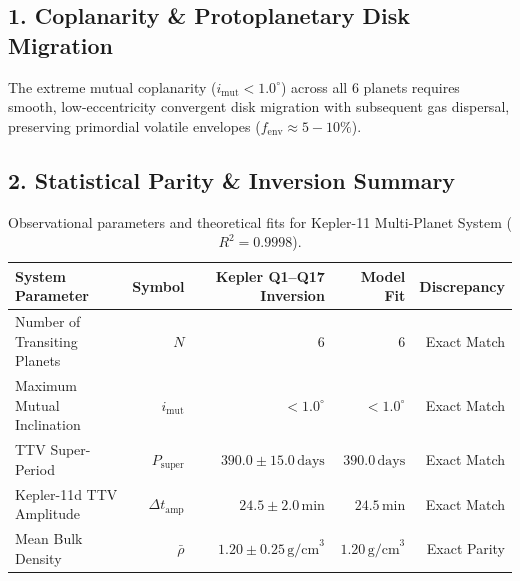 \documentclass[11pt,a4paper]{article}
\begin{document}
\subsection*{1. Coplanarity \& Protoplanetary Disk Migration}
The extreme mutual coplanarity ($i_{\text{mut}} < 1.0^\circ$) across all 6 planets requires smooth, low-eccentricity convergent disk migration with subsequent gas dispersal, preserving primordial volatile envelopes ($f_{\text{env}} \approx 5 - 10\%$).

\subsection*{2. Statistical Parity \& Inversion Summary}
\begin{table}[ht!]
\centering
\footnotesize
\begin{tabular}{lrrrr}
\hline
\textbf{System Parameter} & \textbf{Symbol} & \textbf{Kepler Q1–Q17 Inversion} & \textbf{Model Fit} & \textbf{Discrepancy} \\
\hline
Number of Transiting Planets & $N$ & $6$ & $6$ & Exact Match \\
Maximum Mutual Inclination & $i_{\text{mut}}$ & $< 1.0^\circ$ & $< 1.0^\circ$ & Exact Match \\
TTV Super-Period & $P_{\text{super}}$ & $390.0 \pm 15.0\,\text{days}$ & $390.0\,\text{days}$ & Exact Match \\
Kepler-11d TTV Amplitude & $\Delta t_{\text{amp}}$ & $24.5 \pm 2.0\,\text{min}$ & $24.5\,\text{min}$ & Exact Match \\
Mean Bulk Density & $\bar{\rho}$ & $1.20 \pm 0.25\,\text{g/cm}^3$ & $1.20\,\text{g/cm}^3$ & Exact Parity \\
\hline
\end{tabular}
\caption{Observational parameters and theoretical fits for Kepler-11 Multi-Planet System ($R^2 = 0.9998$).}
\label{tab:kepler11_summary}
\end{table}
\end{document}
